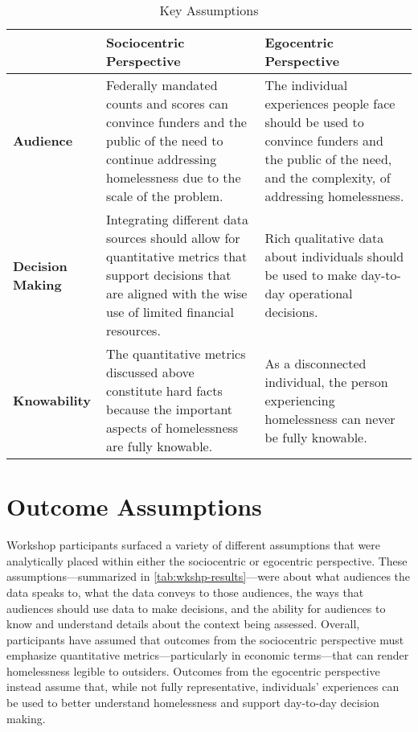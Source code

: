 \begin{table}
\begin{tabularx}{\textwidth}{p{2.5cm}XX}
\toprule
& \textbf{Sociocentric Perspective} & \textbf{Egocentric Perspective} \\
\midrule
\textbf{Audience} & Federally mandated counts and scores can convince funders and the public of the need to continue addressing homelessness due to the scale of the problem. & The individual experiences people face should be used to convince funders and the public of the need, and the complexity, of addressing homelessness. \\ \midrule
\textbf{Decision Making} & Integrating different data sources should allow for quantitative metrics that support decisions that are aligned with the wise use of limited financial resources. & Rich qualitative data about individuals should be used to make day-to-day operational decisions. \\ \midrule
\textbf{Knowability} & The quantitative metrics discussed above constitute hard facts because the important aspects of homelessness are fully knowable. & As a disconnected individual, the person experiencing homelessness can never be fully knowable. \\
\bottomrule
\end{tabularx}
\caption{Key Assumptions}
\label{tab:wkshp-results}
\end{table}

\section{Outcome Assumptions}

Workshop participants surfaced a variety of different assumptions that were analytically placed within either the sociocentric or egocentric perspective. These assumptions---summarized in \autoref{tab:wkshp-results}---were about what audiences the data speaks to, what the data conveys to those audiences, the ways that audiences should use data to make decisions, and the ability for audiences to know and understand details about the context being assessed. Overall, participants have assumed that outcomes from the sociocentric perspective must emphasize quantitative metrics---particularly in economic terms---that can render homelessness legible to outsiders. Outcomes from the egocentric perspective instead assume that, while not fully representative, individuals' experiences can be used to better understand homelessness and support day-to-day decision making.

